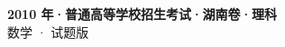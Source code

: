 \documentclass[zihao=-4, a4paper]{ctexart}
\begin{document}
\begin{center}
  {\Large\bfseries 2010 年·普通高等学校招生考试·湖南卷·理科}\\[4pt]
  {\large 数学 · 试题版}
\end{center}
\medskip
{}

\end{document}
